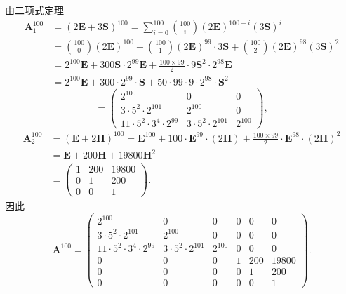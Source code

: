 \documentclass[../../main.tex]{subfiles}
\begin{document}
\begin{solution}
\[\]
由二项式定理
\[
\begin{aligned}
\boldsymbol{A}_1^{100} &= (2\boldsymbol{E} + 3\boldsymbol{S})^{100} = \sum_{i=0}^{100} \binom{100}{i} (2\boldsymbol{E})^{100 - i} (3\boldsymbol{S})^i \\
&= \binom{100}{0} (2\boldsymbol{E})^{100} + \binom{100}{1} (2\boldsymbol{E})^{99} \cdot 3\boldsymbol{S} + \binom{100}{2} (2\boldsymbol{E})^{98} (3\boldsymbol{S})^2 \\
&= 2^{100}\boldsymbol{E} + 300\boldsymbol{S} \cdot 2^{99}\boldsymbol{E} + \frac{100 \times 99}{2} \cdot 9\boldsymbol{S}^2 \cdot 2^{98}\boldsymbol{E} \\
&= 2^{100}\boldsymbol{E} + 300 \cdot 2^{99} \cdot \boldsymbol{S} + 50 \cdot 99 \cdot 9 \cdot 2^{98} \cdot \boldsymbol{S}^2
\end{aligned}
\]
\[
= \begin{pmatrix} 2^{100} & 0 & 0 \\ 3 \cdot 5^2 \cdot 2^{101} & 2^{100} & 0 \\ 11 \cdot 5^2 \cdot 3^4 \cdot 2^{99} & 3 \cdot 5^2 \cdot 2^{101} & 2^{100} \end{pmatrix},
\]
\[
\begin{aligned}
\boldsymbol{A}_2^{100} &= (\boldsymbol{E} + 2\boldsymbol{H})^{100} = \boldsymbol{E}^{100} + 100 \cdot \boldsymbol{E}^{99} \cdot (2\boldsymbol{H}) + \frac{100 \times 99}{2} \cdot \boldsymbol{E}^{98} \cdot (2\boldsymbol{H})^2 \\
&= \boldsymbol{E} + 200\boldsymbol{H} + 19800\boldsymbol{H}^2 \\
&= \begin{pmatrix} 1 & 200 & 19800 \\ 0 & 1 & 200 \\ 0 & 0 & 1 \end{pmatrix}.
\end{aligned}
\]
因此
\[
\boldsymbol{A}^{100} = \begin{pmatrix} 2^{100} & 0 & 0 & 0 & 0 & 0 \\ 3 \cdot 5^2 \cdot 2^{101} & 2^{100} & 0 & 0 & 0 & 0 \\ 11 \cdot 5^2 \cdot 3^4 \cdot 2^{99} & 3 \cdot 5^2 \cdot 2^{101} & 2^{100} & 0 & 0 & 0 \\ 0 & 0 & 0 & 1 & 200 & 19800 \\ 0 & 0 & 0 & 0 & 1 & 200 \\ 0 & 0 & 0 & 0 & 0 & 1 \end{pmatrix}.
\]
\end{solution}
\end{document}

